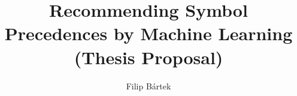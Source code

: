 \title{Recommending Symbol Precedences by Machine Learning (Thesis Proposal)}
\author{Filip Bártek}
